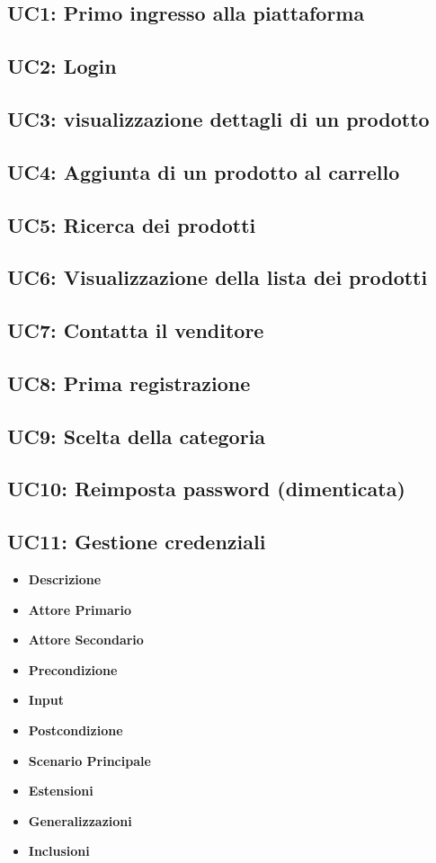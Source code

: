         \subsection{UC1: Primo ingresso alla piattaforma}
        \subsection{UC2: Login}
        \subsection{UC3: visualizzazione dettagli di un prodotto}
        \subsection{UC4: Aggiunta di un prodotto al carrello}
        \subsection{UC5: Ricerca dei prodotti}
        \subsection{UC6: Visualizzazione della lista dei prodotti}
        \subsection{UC7: Contatta il venditore}
        \subsection{UC8: Prima registrazione}
        \subsection{UC9: Scelta della categoria}
        \subsection{UC10: Reimposta password (dimenticata)}
        \subsection{UC11: Gestione credenziali}
        \begin{itemize}
            \item \textbf{Descrizione}
            \item \textbf{Attore Primario}
            \item \textbf{Attore Secondario}
            \item \textbf{Precondizione}
            \item \textbf{Input}
            \item \textbf{Postcondizione}
            \item \textbf{Scenario Principale}
            \item \textbf{Estensioni}
            \item \textbf{Generalizzazioni}
            \item \textbf{Inclusioni}
        \end{itemize}

